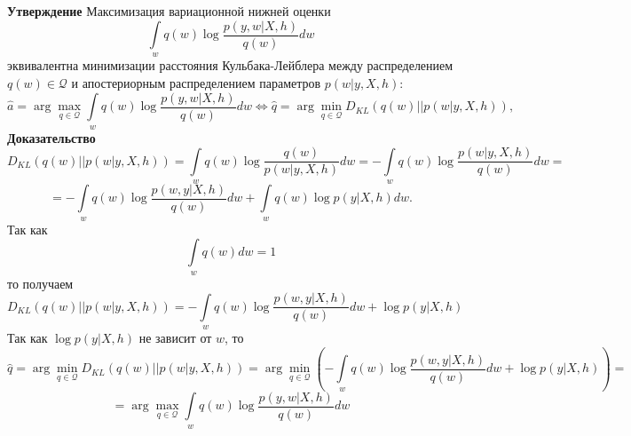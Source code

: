 \documentclass[12pt]{article}
\begin{document}
\noindent\textbf{Утверждение}
Максимизация вариационной нижней оценки
$$\int\limits_{w}{q(w) \log{\dfrac{p(y, w|X, h)}{q(w)}}dw}$$
эквивалентна минимизации расстояния Кульбака-Лейблера между распределением $q(w) \in \mathcal{Q}$ и апостериорным распределением параметров $p(w|y, X, h)$:
$$\hat{a}=\arg\max\limits_{q\in\mathcal{Q}}\int\limits_{w}{q(w) \log{\dfrac{p(y, w|X, h)}{q(w)}}dw} \Leftrightarrow \hat{q}=\arg\min\limits_{q\in\mathcal{Q}}{D_{KL}(q(w)||p(w|y,X,h))},$$
\textbf{Доказательство}
$$D_{KL}(q(w)||p(w|y,X,h)) = \int\limits_{w}{q(w)\log{\dfrac{q(w)}{p(w|y,X,h)}}}dw = -\int\limits_{w}{q(w)\log{\dfrac{p(w|y,X,h)}{q(w)}}}dw=$$
$$=-\int\limits_{w}{q(w)\log{\dfrac{p(w,y|X,h)}{q(w)}}}dw + \int\limits_{w}{q(w)\log{p(y|X,h)}}dw.$$
Так как
$$\int\limits_{w}{q(w)}dw = 1$$
то получаем
$$D_{KL}(q(w)||p(w|y,X,h)) = -\int\limits_{w}{q(w)\log{\dfrac{p(w,y|X,h)}{q(w)}}}dw + \log{p(y|X,h)}$$
Так как $\log{p(y|X,h)}$ не зависит от $w$, то
$$\hat{q}=\arg\min\limits_{q\in\mathcal{Q}}{D_{KL}(q(w)||p(w|y,X,h))} = \arg\min\limits_{q\in\mathcal{Q}}{\left(-\int\limits_{w}{q(w)\log{\dfrac{p(w,y|X,h)}{q(w)}}}dw + \log{p(y|X,h)}\right)} = $$
$$ = \arg\max\limits_{q\in\mathcal{Q}}{\int\limits_{w}{q(w)\log{\dfrac{p(y, w|X,h)}{q(w)}}}dw}$$
\end{document}
